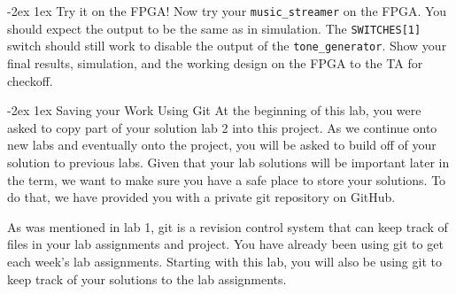 \documentclass[11pt]{article}
\makeatletter
\renewcommand{\section}
{\@startsection {section}{1}{0pt}
 {-2ex}
 {1ex}
 {\bfseries\Large}}
\makeatother
\begin{document}
\section{Try it on the FPGA!}
Now try your \verb|music_streamer| on the FPGA. You should expect the output to be the same as in simulation. The \verb|SWITCHES[1]| switch should still work to disable the output of the \verb|tone_generator|. Show your final results, simulation, and the working design on the FPGA to the TA for checkoff.




\section{Saving your Work Using Git}
At the beginning of this lab, you were asked to copy part of your solution lab 2 into this project.  As we continue onto new labs and eventually onto the project, you will be asked to build off of your solution to previous labs.  Given that your lab solutions will be important later in the term, we want to make sure you have a safe place to store your solutions.  To do that, we have provided you with a private git repository on GitHub.

As was mentioned in lab 1, git is a revision control system that can keep track of files in your lab assignments and project.  You have already been using git to get each week's lab assignments.  Starting with this lab, you will also be using git to keep track of your solutions to the lab assignments.
\end{document}
